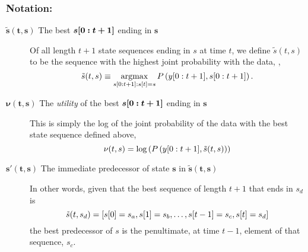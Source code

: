\subsubsection*{Notation:}
\begin{description}
\item[$\bm{\tilde s (t,s)}$ The best $\bm{s[0:t+1]}$ ending in
  $\bm{s}$] Of all length $t+1$ state sequences ending in $s$ at time
  $t$, we define $\tilde s(t,s)$ to be the sequence with the highest
  joint probability with the data, \ie,
  \begin{equation*}
    \tilde s(t,s) \equiv \operatorname*{argmax}_{ s[0:t+1]:{s}{[t]}=s}
    P\left(y[0:t+1], s[0:t+1] \right).
  \end{equation*}
\item[$\bm{\nu(t,s)}$ The \emph{utility} of the best
  $\bm{s[0:t+1]}$ ending in $\bm{s}$] %
  This is simply the log of the joint
  probability of the data with the best state sequence defined above,
  \ie
  \begin{equation*}
    \nu(t,s) = \log\left( P\left(y[0:t+1], \tilde s(t,s)
      \right) \right)
  \end{equation*}
\item[$\bm{s'(t,s)}$ The immediate predecessor of state $\bm{s}$ in
  $\bm{\tilde s (t,s)}$] In other words, given that the best sequence
  of length $t+1$ that ends in $s_d$ is
  \begin{equation*}
    \tilde s (t,s_d) = \left[ {s}{[0]}=s_a, {s}{[1]}=s_b, \ldots, {s}{[t-1]}=s_c,
      {s}{[t]}= s_d\right]
  \end{equation*}
  the best predecessor of $s$ is the
  penultimate, \ie at time $t-1$, element of that sequence, \ie $s_c$.
\end{description}

